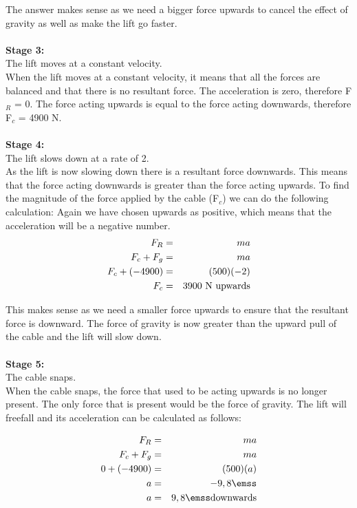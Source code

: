 The answer makes sense as we need a bigger force upwards to cancel the effect of gravity as well as make the lift go faster.\\
\\
{\bf{Stage 3:}}\\ The lift moves at a constant velocity.\\
When the lift moves at a constant velocity, it means that all the forces are balanced and that there is no resultant force. The acceleration is zero, therefore F$_{R}$ = 0. The force acting upwards is equal to the force acting downwards, therefore F$_{c}$ = 4900 N.\\
\\
{\bf{Stage 4:}}\\ The lift slows down at a rate of 2\mss.\\
As the lift is now slowing down there is a resultant force downwards. This means that the force acting downwards is greater than the force acting upwards. To find the magnitude of the force applied by the cable (F$_{c}$) we can do the following calculation: Again we have chosen upwards as positive, which means that the acceleration will be a negative number.\\

\begin{eqnarray*}
F_{R} &=& ma\\
F_{c}+ F_{g} &=& ma\\
F_{c}+ (-4900) &=& (500)(-2)\\
F_{c} &=& 3900~\rm{N~upwards}
\end{eqnarray*}

This makes sense as we need a smaller force upwards to ensure that the resultant force is downward. The force of gravity is now greater than the upward pull of the cable and the lift will slow down.\\
\\
{\bf{Stage 5:}}\\ The cable snaps.\\
When the cable snaps, the force that used to be acting upwards is no longer present. The only force that is present would be the force of gravity. The lift will freefall and its acceleration can be calculated as follows: 

\begin{eqnarray*}
F_{R} &=& ma\\
F_{c}+ F_{g} &=& ma\\
0 + (-4900) &=& (500)(a)\\
a &=& -9,8 \emss\\
a &=& 9,8 \emss \rm{downwards}
\end{eqnarray*}

